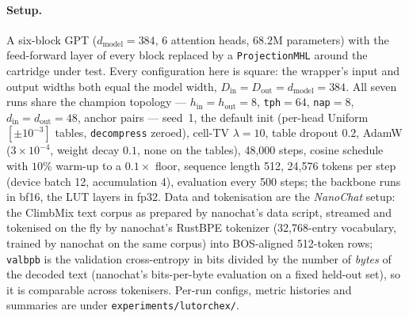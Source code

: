 \documentclass[11pt]{article}
\DeclareRobustCommand{\code}[1]{{\renewcommand{\_}{\textunderscore\allowbreak}\texttt{#1}}}
\begin{document}
\paragraph{Setup.} A six-block GPT ($d_\text{model}=384$, 6 attention heads, $68.2$M parameters) with the
feed-forward layer of every block replaced by a \code{ProjectionMHL} around the cartridge under test.
Every configuration here is square: the wrapper's input and output widths both equal the model width,
$D_\text{in}=D_\text{out}=d_\text{model}=384$. All
seven runs share the champion topology --- $h_\text{in}=h_\text{out}=8$, \code{tph}$=64$, \code{nap}$=8$,
$d_\text{in}=d_\text{out}=48$, anchor pairs --- seed~1, the default init (per-head Uniform$[\pm10^{-3}]$
tables, \code{decompress} zeroed), cell-TV
$\lambda=10$, table dropout $0.2$, AdamW ($3\!\times\!10^{-4}$, weight decay $0.1$, none on the tables),
48{,}000 steps, cosine schedule with $10\%$ warm-up to a $0.1\times$ floor, sequence length 512, 24{,}576
tokens per step (device batch 12, accumulation 4), evaluation every 500 steps; the backbone runs in bf16,
the LUT layers in fp32. Data and tokenisation are the \emph{NanoChat} setup: the ClimbMix text corpus as
prepared by nanochat's data script, streamed and tokenised on the fly by nanochat's RustBPE tokenizer
(32{,}768-entry vocabulary, trained by nanochat on the same corpus) into BOS-aligned 512-token rows;
\code{val\_bpb} is the validation cross-entropy in bits divided by the number of \emph{bytes} of the
decoded text (nanochat's bits-per-byte evaluation on a fixed held-out set), so it is comparable across
tokenisers. Per-run configs, metric histories and summaries are under \code{experiments/lutorch\_ex/}.
\end{document}
